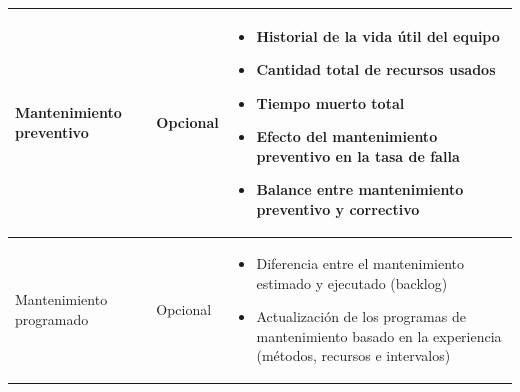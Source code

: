 \begin{ThreePartTable}
\begin{longtable}{@{}P{0.2\textwidth}P{0.2\textwidth}P{0.6\textwidth} @{}}
        \midrule

        Mantenimiento preventivo &
            Opcional &
                \begin{itemize}[left=1em, nosep]
                    \item Historial de la vida útil del equipo
                    \item Cantidad total de recursos usados
                    \item Tiempo muerto total
                    \item Efecto del mantenimiento preventivo en la tasa de falla
                    \item Balance entre mantenimiento preventivo y correctivo
                \end{itemize} \\

        \midrule

        Mantenimiento programado &
            Opcional &
                \begin{itemize}[left=1em, nosep]
                    \item Diferencia entre el mantenimiento estimado y ejecutado (backlog)
                    \item Actualización de los programas de mantenimiento basado en la experiencia (métodos, recursos e intervalos)
                \end{itemize} \\

    \end{longtable}

\end{ThreePartTable}
